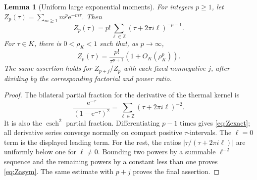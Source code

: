 \documentclass[11pt,a4paper]{article}
\newcommand{\ee}{\mathrm e}
\newcommand{\Z}{\mathbb Z}
\numberwithin{equation}{section}
\theoremstyle{plain}
\newtheorem{lemma}[theorem]{Lemma}
\theoremstyle{definition}
\theoremstyle{remark}
\begin{document}
\begin{lemma}[Uniform large exponential moments]
\label{lem:moments}
For integers $p\ge1$, let $Z_p(\tau)=\sum_{m\ge1}m^p\ee^{-m\tau}$. Then
\begin{equation}
 Z_p(\tau)=p!\sum_{\ell\in\Z}(\tau+2\pi i\ell)^{-p-1}.
 \label{eq:Zexact}
\end{equation}
For $\tau\in K$, there is $0<\rho_K<1$ such that, as $p\to\infty$,
\begin{equation}
 Z_p(\tau)=\frac{p!}{\tau^{p+1}}
                       \left(1+O_K(\rho_K^p)\right).
 \label{eq:Zasym}
\end{equation}
The same assertion holds for $Z_{p+j}/Z_p$ with each fixed nonnegative $j$,
after dividing by the corresponding factorial and power ratio.
\end{lemma}
\begin{proof}
The bilateral partial fraction for the derivative of the thermal kernel is
\[
 \frac{\ee^{-\tau}}{(1-\ee^{-\tau})^2}
       =\sum_{\ell\in\Z}(\tau+2\pi i\ell)^{-2}.
\]
It is also the $\operatorname{csch}^2$ partial fraction. Differentiating
$p-1$ times gives \eqref{eq:Zexact}; all derivative series converge normally
on compact positive $\tau$-intervals. The $\ell=0$ term is the displayed
leading term. For the rest, the ratios
$|\tau/(\tau+2\pi i\ell)|$ are uniformly below one for $\ell\ne0$.
Bounding two powers by a summable $\ell^{-2}$ sequence and the remaining
powers by a constant less than one proves \eqref{eq:Zasym}. The same estimate
with $p+j$ proves the final assertion.
\end{proof}
\end{document}

